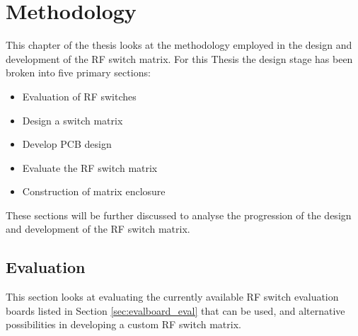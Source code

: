 \documentclass[12pt,openany,a4paper]{book}
\begin{document}
\chapter{Methodology}
This chapter of the thesis looks at the methodology employed in the design and development of the RF switch matrix. For this Thesis the design stage has been broken into five primary sections:\\[-0.8cm]
\begin{itemize}
	\setlength\itemsep{-0.5em}
	\item Evaluation of RF switches
	\item Design a switch matrix
	\item Develop PCB design
	\item Evaluate the RF switch matrix
	\item Construction of matrix enclosure
\end{itemize}
These sections will be further discussed to analyse the progression of the design and development of the RF switch matrix.

\section{Evaluation}
This section looks at evaluating the currently available RF switch evaluation boards listed in Section \ref{sec:evalboard_eval} that can be used, and alternative possibilities in developing a custom RF switch matrix.
\end{document}
